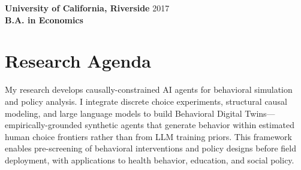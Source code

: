 \documentclass[11pt, letterpaper]{article}
\begin{document}
\vspace{0.5em}
\noindent \textbf{University of California, Riverside} \hfill 2017 \\
\textbf{B.A. in Economics}

\section*{Research Agenda}
My research develops causally-constrained AI agents for behavioral simulation and policy analysis. I integrate discrete choice experiments, structural causal modeling, and large language models to build Behavioral Digital Twins---empirically-grounded synthetic agents that generate behavior within estimated human choice frontiers rather than from LLM training priors. This framework enables pre-screening of behavioral interventions and policy designs before field deployment, with applications to health behavior, education, and social policy.
\end{document}
